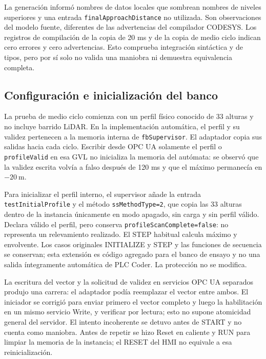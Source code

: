 \documentclass[a4paper,10pt,onecolumn,journal]{ieeeconf}
\numberwithin{equation}{section}
\begin{document}
La generación informó nombres de datos locales que sombrean nombres de niveles superiores y una entrada \texttt{finalApproachDistance} no utilizada. Son observaciones del modelo fuente, diferentes de las advertencias del compilador CODESYS. Los registros de compilación de la copia de 20 ms y de la copia de medio ciclo indican cero errores y cero advertencias. Esto comprueba integración sintáctica y de tipos, pero por sí solo no valida una maniobra ni demuestra equivalencia completa.


\subsection{Configuración e inicialización del banco}
La prueba de medio ciclo comienza con un perfil físico conocido de 33 alturas y no incluye barrido LiDAR. En la implementación automática, el perfil y su validez pertenecen a la memoria interna de \texttt{fbSupervisor}. El adaptador copia sus salidas hacia  cada ciclo. Escribir desde OPC UA solamente el perfil o \texttt{profileValid} en esa GVL no inicializa la memoria del autómata: se observó que la validez escrita volvía a falso después de 120 ms y que el máximo permanecía en $-20~\mathrm{m}$.

Para inicializar el perfil interno, el supervisor añade la entrada \texttt{testInitialProfile} y el método \texttt{ssMethodType=2}, que copia las 33 alturas dentro de la instancia únicamente en modo apagado, sin carga y sin perfil válido. Declara válido el perfil, pero conserva \texttt{profileScanComplete=false}: no representa un relevamiento realizado. El STEP habitual calcula máximo y envolvente. Los casos originales INITIALIZE y STEP y las funciones de secuencia se conservan; esta extensión es código agregado para el banco de ensayo y no una salida íntegramente automática de PLC Coder. La protección no se modifica.

La escritura del vector y la solicitud de validez en servicios OPC UA separados produjo una carrera: el adaptador podía reemplazar el vector entre ambos. El iniciador se corrigió para enviar primero el vector completo y luego la habilitación en un mismo servicio Write, y verificar por lectura; esto no supone atomicidad general del servidor. El intento incoherente se detuvo antes de START y no cuenta como maniobra. Antes de repetir se hizo Reset en caliente y RUN para limpiar la memoria de la instancia; el RESET del HMI no equivale a esa reinicialización.
\end{document}
